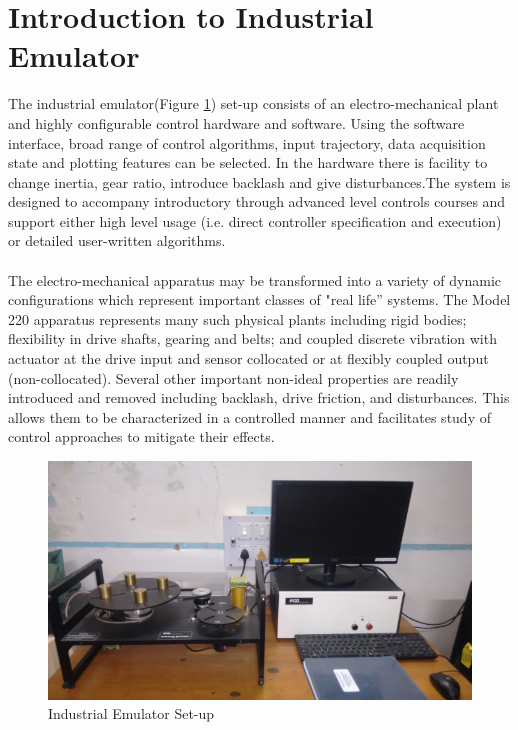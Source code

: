 \documentclass[11pt, a4paper]{article}
\begin{document}
\section{Introduction to Industrial Emulator}
The industrial emulator(Figure \ref{Fig1}) set-up consists of an electro-mechanical plant and highly configurable control hardware and software. Using the software interface, broad range of control algorithms, input trajectory, data acquisition state and plotting features can be selected. In the hardware there is facility to change inertia, gear ratio, introduce backlash and give disturbances.The system is designed to accompany introductory through advanced level controls courses and support either high level usage (i.e. direct controller specification and execution) or detailed user-written algorithms. \\
\\
The electro-mechanical apparatus may be transformed into a variety of dynamic configurations which represent important classes of "real life” systems. The Model 220 apparatus represents many such physical plants including rigid bodies; flexibility in drive shafts, gearing and belts; and coupled discrete vibration with actuator at the drive input and sensor collocated or at flexibly coupled output (non-collocated). Several other important non-ideal properties are readily introduced and removed including backlash, drive friction, and disturbances. This allows them to be characterized in a controlled manner and facilitates study of control approaches to mitigate their effects.
\begin{figure}[H]
\centering
\includegraphics[width = \textwidth]{full.png}
\caption{Industrial Emulator Set-up}
\label{Fig1}
\end{figure}
\end{document}
